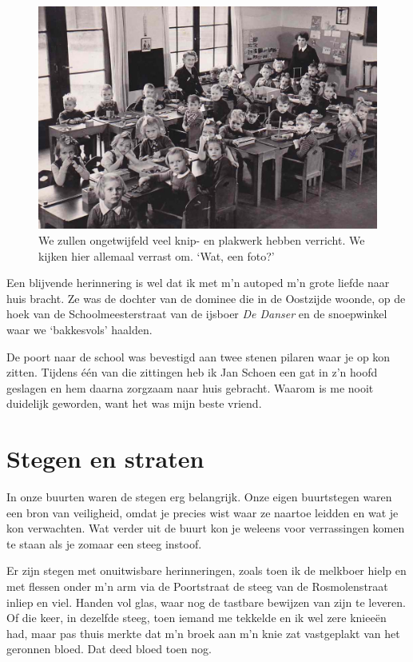\documentclass[10pt,twoside, openright]{memoir}
\begin{document}
\begin{figure}
\includegraphics[width=\textwidth]{img/ch6/kleuterschool2}
\caption*{\footnotesize We zullen ongetwijfeld veel knip- en plakwerk hebben verricht. We kijken hier allemaal verrast om. `Wat, een foto?'}
\end{figure}

Een blijvende herinnering is wel dat ik met m’n autoped m’n grote liefde naar huis bracht. Ze was de dochter van de dominee die in de Oostzijde woonde, op de hoek van de Schoolmeesterstraat van de ijsboer \emph{De Danser} en de snoepwinkel waar we `bakkesvols' haalden. 

De poort naar de school was bevestigd aan twee stenen pilaren waar je op kon zitten. Tijdens één van die zittingen heb ik Jan Schoen een gat in z’n hoofd geslagen en hem daarna zorgzaam naar huis gebracht. Waarom is me nooit duidelijk geworden, want het was mijn beste vriend. 



\section{Stegen en straten} %
\label{cha:stegen_straten}

In onze buurten waren de stegen erg belangrijk. Onze eigen buurtstegen waren een bron van veiligheid, omdat je precies wist waar ze naartoe leidden en wat je kon verwachten. Wat verder uit de buurt kon je weleens voor verrassingen komen te staan als je zomaar een steeg instoof. 

Er zijn stegen met onuitwisbare herinneringen, zoals toen ik de melkboer hielp en met flessen onder m’n arm via de Poortstraat de steeg van de Rosmolenstraat inliep en viel. Handen vol glas, waar nog de tastbare bewijzen van zijn te leveren. Of die keer, in dezelfde steeg, toen iemand me tekkelde en ik wel zere knieeën had, maar pas thuis merkte dat m’n broek aan m’n knie zat vastgeplakt van het geronnen bloed. Dat deed bloed toen nog.
\end{document}
